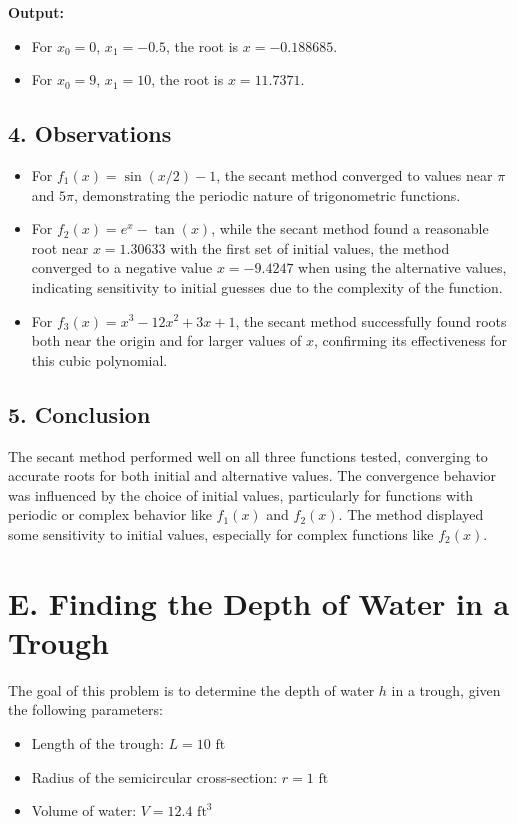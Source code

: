 \documentclass[a4paper]{article}
\begin{document}
\textbf{Output:}
\begin{itemize}
    \item For \(x_0 = 0\), \(x_1 = -0.5\), the root is \(x = -0.188685\).
    \item For \(x_0 = 9\), \(x_1 = 10\), the root is \(x = 11.7371\).
\end{itemize}

\subsection*{4. Observations}

\begin{itemize}
    \item For \(f_1(x) = \sin(x/2) - 1\), the secant method converged to values near \(\pi\) and \(5\pi\), demonstrating the periodic nature of trigonometric functions. 
    \item For \(f_2(x) = e^x - \tan(x)\), while the secant method found a reasonable root near \(x = 1.30633\) with the first set of initial values, the method converged to a negative value \(x = -9.4247\) when using the alternative values, indicating sensitivity to initial guesses due to the complexity of the function.
    \item For \(f_3(x) = x^3 - 12x^2 + 3x + 1\), the secant method successfully found roots both near the origin and for larger values of \(x\), confirming its effectiveness for this cubic polynomial.
\end{itemize}

\subsection*{5. Conclusion}

The secant method performed well on all three functions tested, converging to accurate roots for both initial and alternative values. The convergence behavior was influenced by the choice of initial values, particularly for functions with periodic or complex behavior like \(f_1(x)\) and \(f_2(x)\). The method displayed some sensitivity to initial values, especially for complex functions like \(f_2(x)\).

\section*{E. Finding the Depth of Water in a Trough}

The goal of this problem is to determine the depth of water \( h \) in a trough, given the following parameters:
\begin{itemize}
    \item Length of the trough: \( L = 10 \text{ ft} \)
    \item Radius of the semicircular cross-section: \( r = 1 \text{ ft} \)
    \item Volume of water: \( V = 12.4 \text{ ft}^3 \)
\end{itemize}
\end{document}
